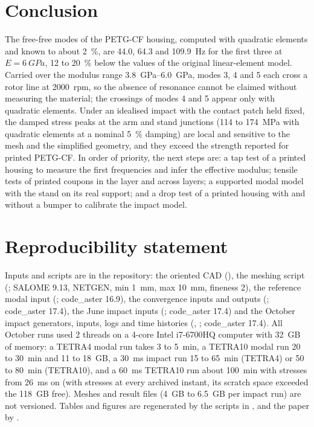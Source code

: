 \documentclass[11pt]{article}
\begin{document}
\section{Conclusion}

The free-free modes of the PETG-CF housing, computed with quadratic elements and known to about \SI{2}{\%}, are 44.0,
64.3 and \SI{109.9}{Hz} for the first three at $E=\SI{6}{GPa}$, 12 to \SI{20}{\%} below the values of the original linear-element model. Carried over
the modulus range \SIrange{3.8}{6.0}{GPa}, modes 3, 4 and 5 each cross a rotor line at \SI{2000}{rpm}, so
the absence of resonance cannot be claimed without measuring the material; the crossings of modes 4 and 5 appear
only with quadratic elements. Under an idealised impact with the contact
patch held fixed, the damped stress peaks at the arm and stand junctions (114 to \SI{174}{MPa} with quadratic
elements at a nominal \SI{5}{\%} damping) are local and sensitive to the mesh and the simplified geometry, and they
exceed the strength reported for printed PETG-CF. In order of priority, the next steps are: a tap test of a printed
housing to measure the first frequencies and infer the effective modulus; tensile tests of printed coupons in the
layer and across layers; a supported modal model with the stand on its real support; and a drop test of a printed
housing with and without a bumper to calibrate the impact model.

\section*{Reproducibility statement}

Inputs and scripts are in the repository: the oriented CAD (), the meshing script
(; SALOME 9.13, NETGEN, min \SI{1}{mm}, max \SI{10}{mm}, fineness 2), the reference
modal input (; code\_aster 16.9), the convergence inputs and outputs (;
code\_aster 17.4), the June impact inputs (; code\_aster 17.4) and the October impact generators,
inputs, logs and time histories (, ; code\_aster 17.4). All
October runs used 2 threads on a 4-core Intel i7-6700HQ computer with \SI{32}{GB} of memory: a TETRA4 modal run takes 3 to
\SI{5}{min}, a TETRA10 modal run 20 to \SI{30}{min} and 11 to \SI{18}{GB}, a \SI{30}{ms} impact run 15 to \SI{65}{min}
(TETRA4) or 50 to \SI{80}{min} (TETRA10), and a \SI{60}{ms} TETRA10 run about \SI{100}{min} with stresses from
\SI{26}{ms} on (with stresses at every archived instant, its scratch space exceeded the \SI{118}{GB} free). Meshes and result files (\SI{4}{GB} to \SI{6.5}{GB} per impact run) are not
versioned. Tables and figures are regenerated by the scripts in , and the paper by
.



\end{document}

